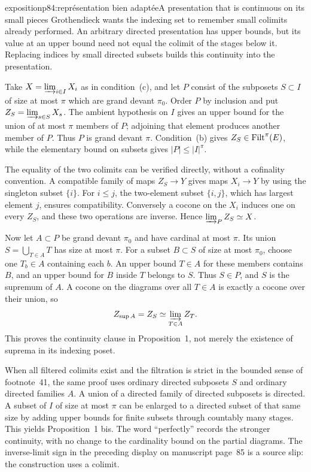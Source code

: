 \begin{dcomment}{exposition}{p84:représentation bien adaptée}{A presentation that is continuous on its small pieces}
Grothendieck wants the indexing set to remember small colimits already performed. An arbitrary directed presentation has upper bounds, but its value at an upper bound need not equal the colimit of the stages below it. Replacing indices by small directed subsets builds this continuity into the presentation.

Take $X=\varinjlim_{i\in I}X_i$ as in condition~(c), and let $P$ consist of the subposets $S\subset I$ of size at most $\pi$ which are grand devant $\pi_0$. Order $P$ by inclusion and put $Z_S=\varinjlim_{s\in S}X_s$. The ambient hypothesis on $I$ gives an upper bound for the union of at most $\pi$ members of $P$; adjoining that element produces another member of $P$. Thus $P$ is grand devant $\pi$. Condition~(b) gives $Z_S\in\mathrm{Filt}^\pi(E)$, while the elementary bound on subsets gives $|P|\leq|I|^\pi$.

The equality of the two colimits can be verified directly, without a cofinality convention. A compatible family of maps $Z_S\to Y$ gives maps $X_i\to Y$ by using the singleton subset $\{i\}$. For $i\leq j$, the two-element subset $\{i,j\}$, which has largest element $j$, ensures compatibility. Conversely a cocone on the $X_i$ induces one on every $Z_S$, and these two operations are inverse. Hence $\varinjlim_P Z_S\simeq X$.

Now let $A\subset P$ be grand devant $\pi_0$ and have cardinal at most $\pi$. Its union $S=\bigcup_{T\in A}T$ has size at most $\pi$. For a subset $B\subset S$ of size at most $\pi_0$, choose one $T_b\in A$ containing each $b$. An upper bound $T\in A$ for these members contains $B$, and an upper bound for $B$ inside $T$ belongs to $S$. Thus $S\in P$, and $S$ is the supremum of $A$. A cocone on the diagrams over all $T\in A$ is exactly a cocone over their union, so
\[
 Z_{\sup A}=Z_S\simeq\varinjlim_{T\in A}Z_T.
\]
This proves the continuity clause in Proposition~1, not merely the existence of suprema in its indexing poset.

When all filtered colimits exist and the filtration is strict in the bounded sense of footnote~41, the same proof uses ordinary directed subposets $S$ and ordinary directed families $A$. A union of a directed family of directed subposets is directed. A subset of $I$ of size at most $\pi$ can be enlarged to a directed subset of that same size by adding upper bounds for finite subsets through countably many stages. This yields Proposition~1 bis. The word ``perfectly'' records the stronger continuity, with no change to the cardinality bound on the partial diagrams. The inverse-limit sign in the preceding display on manuscript page~85 is a source slip: the construction uses a colimit.
\end{dcomment}


